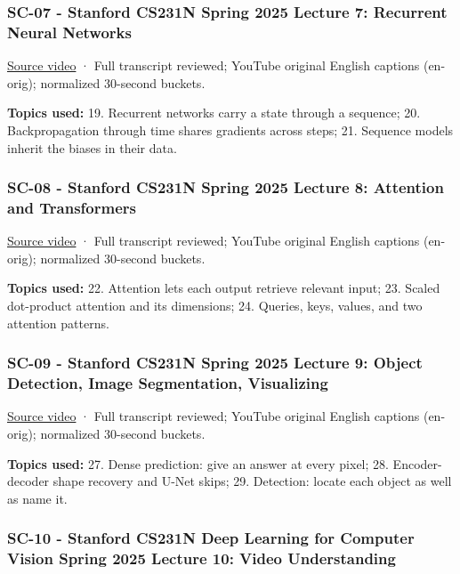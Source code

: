 \subsubsection{SC-07 - Stanford CS231N Spring 2025 Lecture 7: Recurrent Neural Networks}\label{04-visual-computing-ii-ch036-sc-07---stanford-cs231n-spring-2025-lecture-7-recurrent-neural-networks}

\href{https://www.youtube.com/watch?v=kG2lAPBF7zA}{Source video} · Full transcript reviewed; YouTube original English captions (en-orig); normalized 30-second buckets.

\textbf{Topics used:} 19. Recurrent networks carry a state through a sequence; 20. Backpropagation through time shares gradients across steps; 21. Sequence models inherit the biases in their data.

\subsubsection{SC-08 - Stanford CS231N Spring 2025 Lecture 8: Attention and Transformers}\label{04-visual-computing-ii-ch036-sc-08---stanford-cs231n-spring-2025-lecture-8-attention-and-transformers}

\href{https://www.youtube.com/watch?v=RQowiOF_FvQ}{Source video} · Full transcript reviewed; YouTube original English captions (en-orig); normalized 30-second buckets.

\textbf{Topics used:} 22. Attention lets each output retrieve relevant input; 23. Scaled dot-product attention and its dimensions; 24. Queries, keys, values, and two attention patterns.

\subsubsection{SC-09 - Stanford CS231N Spring 2025 Lecture 9: Object Detection, Image Segmentation, Visualizing}\label{04-visual-computing-ii-ch036-sc-09---stanford-cs231n-spring-2025-lecture-9-object-detection-image-segmentation-visualizing}

\href{https://www.youtube.com/watch?v=PTypu6GqEd4}{Source video} · Full transcript reviewed; YouTube original English captions (en-orig); normalized 30-second buckets.

\textbf{Topics used:} 27. Dense prediction: give an answer at every pixel; 28. Encoder-decoder shape recovery and U-Net skips; 29. Detection: locate each object as well as name it.

\subsubsection{SC-10 - Stanford CS231N Deep Learning for Computer Vision Spring 2025 Lecture 10: Video Understanding}\label{04-visual-computing-ii-ch036-sc-10---stanford-cs231n-deep-learning-for-computer-vision-spring-2025-lecture-10-video-understanding}

